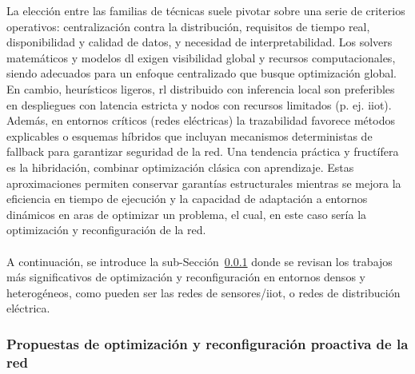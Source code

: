 La elección entre las familias de técnicas suele pivotar sobre una serie de criterios operativos: centralización contra la distribución, requisitos de tiempo real, disponibilidad y calidad de datos, y necesidad de interpretabilidad. Los solvers matemáticos y modelos \gls{dl} exigen visibilidad global y recursos computacionales, siendo adecuados para un enfoque centralizado que busque optimización global. En cambio, heurísticos ligeros, \gls{rl}  distribuido con inferencia local son preferibles en despliegues con latencia estricta y nodos con recursos limitados (p. ej. \gls{iiot}). Además, en entornos críticos (redes eléctricas) la trazabilidad favorece métodos explicables o esquemas híbridos que incluyan mecanismos deterministas de fallback para garantizar seguridad de la red. Una tendencia práctica y fructífera es la hibridación, combinar optimización clásica con aprendizaje. Estas aproximaciones permiten conservar garantías estructurales mientras se mejora la eficiencia en tiempo de ejecución y la capacidad de adaptación a entornos dinámicos en aras de optimizar un problema, el cual, en este caso sería la optimización y reconfiguración de la red. \\
\\
A continuación, se introduce la sub-Sección~\ref{subsubsec:propuestas_optimizacion} donde se revisan los trabajos más significativos de optimización y reconfiguración en entornos densos y heterogéneos, como pueden ser las redes de sensores/\gls{iiot}, o redes de distribución eléctrica. 


\subsubsection{Propuestas de optimización y reconfiguración proactiva de la red}
\label{subsubsec:propuestas_optimizacion}

